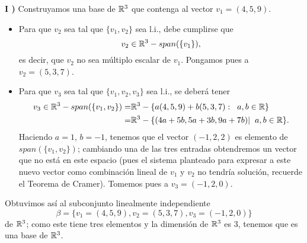 \textbf{I )} Construyamos una base de $\mathbb{R}^{3}$ que contenga al vector $v_{1} = (4, 5, 9)$.
\begin{itemize}
	\item Para que $v_{2}$ sea tal que $\{ v_{1}, v_{2} \}$ sea l.i.,
	debe cumplirse que 
	\[
	v_{2} \in \mathbb{R}^{3} - span(\{ v_{1} \}), 
	\]
	es decir, que $v_{2}$ no sea múltiplo escalar de $v_{1}$. Pongamos pues
	a $v_{2} = (5, 3, 7)$.
	\item Para que $v_{3}$ sea tal que $\{ v_{1}, v_{2}, v_{3} \}$ 
	sea l.i., se deberá tener 
	\begin{align*}
	v_{3} \in \mathbb{R}^{3} - span(\{ v_{1}, v_{2} \} )
	= &
	\mathbb{R}^{3} - \{ a(4, 5, 9) + b (5, 3, 7) : \hspace{0.2cm} a, b \in \mathbb{R} \} \\
	= & 
	\mathbb{R}^{3} - \{ (4a+5b, 5a+3b, 9a+7b)  | \hspace{0.2cm} a, b \in \mathbb{R} \}.
	\end{align*}
	Haciendo $a = 1$, $b = -1$, tenemos que el vector 
	$(-1, 2, 2)$ es elemento de $span(\{ v_{1}, v_{2} \})$; cambiando
	una de las tres entradas obtendremos un vector que no está en este
	espacio (pues el sistema planteado para expresar a este nuevo vector
	como combinación lineal de $v_{1}$ y $v_{2}$ no tendría solución,
	recuerde el Teorema de Cramer). Tomemos pues a $v_{3} = (-1, 2, 0)$.
\end{itemize}
Obtuvimos así al subconjunto linealmente independiente
\[
\beta = 
\{ v_{1} = (4, 5, 9), v_{2} = (5, 3, 7), v_{3} = (-1, 2, 0) \}
\]
de $\mathbb{R}^{3}$; como este tiene tres elementos y la dimensión de 
$\mathbb{R}^{3}$ es $3$, tenemos que es una base de $\mathbb{R}^{3}$.

